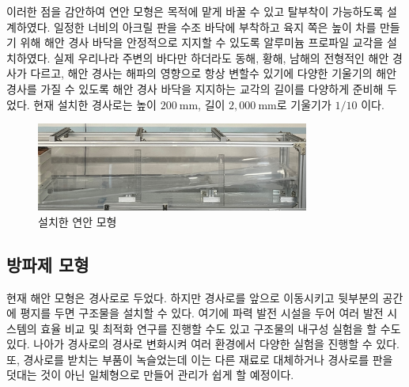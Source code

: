 이러한 점을 감안하여 연안 모형은 목적에 맡게 바꿀 수 있고 탈부착이 가능하도록 설계하였다. 일정한 너비의 아크릴 판을 수조 바닥에 부착하고 육지 쪽은 높이 차를 만들기 위해 해안 경사 바닥을 안정적으로 지지할 수 있도록 알루미늄 프로파일 교각을 설치하였다. 실제 우리나라 주변의 바다만 하더라도 동해, 황해, 남해의 전형적인 해안 경사가 다르고, 해안 경사는 해파의 영향으로 항상 변할수 있기에 다양한 기울기의 해안 경사를 가질 수 있도록 해안 경사 바닥을 지지하는 교각의 길이를 다양하게 준비해 두었다. 현재 설치한 경사로는 높이 $200\mathrm{~mm}$, 길이 $2,000\mathrm{~mm}$로 기울기가 $1/10$ 이다. 

\begin{figure}[htbp]
	\begin{center}
		\includegraphics[width=0.8\textwidth]{images/slope.jpg}
		\caption{설치한 연안 모형}
		\label{Slope}
	\end{center}
\end{figure}


\subsection{방파제 모형}
현재 해안 모형은 경사로로 두었다. 하지만 경사로를 앞으로 이동시키고 뒷부분의 공간에 평지를 두면 구조물을 설치할 수 있다. 여기에 파력 발전 시설을 두어 여러 발전 시스템의 효율 비교 및 최적화 연구를 진행할 수도 있고 구조물의 내구성 실험을 할 수도 있다. 나아가 경사로의 경사로 변화시켜 여러 환경에서 다양한 실험을 진행할 수 있다. 또, 경사로를 받치는 부품이 녹슬었는데 이는 다른 재료로 대체하거나 경사로를 판을 덧대는 것이 아닌 일체형으로 만들어 관리가 쉽게 할 예정이다.

